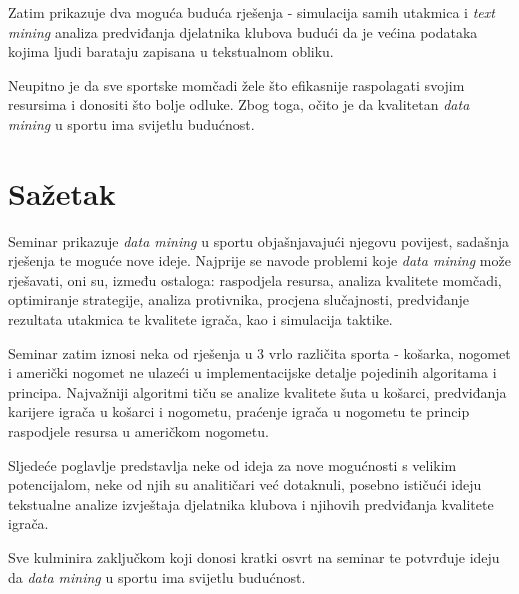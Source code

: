 \documentclass{ferseminar}
\begin{document}
Zatim prikazuje dva moguća buduća rješenja - simulacija samih utakmica i \textit{text mining} analiza predviđanja djelatnika klubova budući da je većina podataka kojima ljudi barataju zapisana u tekstualnom obliku.

Neupitno je da sve sportske momčadi žele što efikasnije raspolagati svojim resursima i donositi što bolje odluke. Zbog toga, očito je da kvalitetan \textit{data mining} u sportu ima svijetlu budućnost.

\section{Sažetak}

Seminar prikazuje \textit{data mining} u sportu objašnjavajući njegovu povijest, sadašnja rješenja te moguće nove ideje. Najprije se navode problemi koje \textit{data mining} može rješavati, oni su, između ostaloga: raspodjela resursa, analiza kvalitete momčadi, optimiranje strategije, analiza protivnika, procjena slučajnosti, predviđanje rezultata utakmica te kvalitete igrača, kao i simulacija taktike.

Seminar zatim iznosi neka od rješenja u 3 vrlo različita sporta - košarka, nogomet i američki nogomet ne ulazeći u implementacijske detalje pojedinih algoritama i principa. Najvažniji algoritmi tiču se analize kvalitete šuta u košarci, predviđanja karijere igrača u košarci i nogometu, praćenje igrača u nogometu te princip raspodjele resursa u američkom nogometu.

Sljedeće poglavlje predstavlja neke od ideja za nove mogućnosti s velikim potencijalom, neke od njih su analitičari već dotaknuli, posebno ističući ideju tekstualne analize izvještaja djelatnika klubova i njihovih predviđanja kvalitete igrača.

Sve kulminira zaključkom koji donosi kratki osvrt na seminar te potvrđuje ideju da \textit{data mining} u sportu ima svijetlu budućnost.
\end{document}
